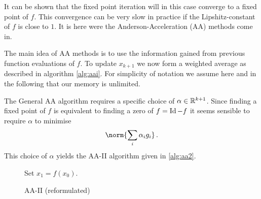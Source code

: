 It can be shown that the fixed point iteration will in this case converge to a fixed point of $f$. This convergence can be very slow in practice if the Lipshitz-constant of $f$ is close to $1$. It is here were the Anderson-Acceleration (AA) methods come in.

The main idea of AA methods is to use the information gained from previous function evaluations of $f$. To update $x_{k+1}$ we now form a weighted average as described in algorithm \ref{alg:aai}. For simplicity of notation we assume here and in the following that our memory is unlimited.

The General AA algorithm requires a specific choice of $\alpha\in\mathbb{R}^{k+1}$. Since finding a fixed point of $f$ is equivalent to finding a zero of $f=\operatorname{Id}-f$ it seems sensible to require $\alpha$ to minimise
\begin{align*}
	\norm{\sum_i\alpha_ig_i}\,.
\end{align*}
This choice of $\alpha$ yields the AA-II algorithm given in \ref{alg:aa2}.

\begin{figure}
\centering
\begin{algorithm}[H]
\caption{AA-II (reformulated)}
\label{alg:aa2-ref}

\BlankLine
{\black Set $x_1 =f(x_0)$.}

\end{algorithm}
\end{figure}

